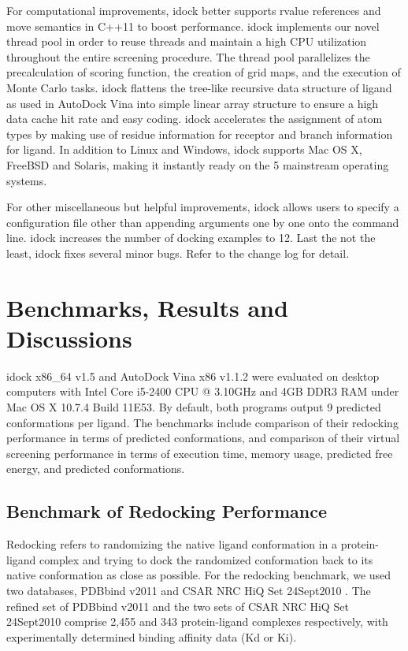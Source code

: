 \documentclass[10pt,conference,compsocconf]{../IEEEtran}
\begin{document}
For computational improvements, idock better supports rvalue references and move semantics in C++11 to boost performance. idock implements our novel thread pool in order to reuse threads and maintain a high CPU utilization throughout the entire screening procedure. The thread pool parallelizes the precalculation of scoring function, the creation of grid maps, and the execution of Monte Carlo tasks. idock flattens the tree-like recursive data structure of ligand as used in AutoDock Vina into simple linear array structure to ensure a high data cache hit rate and easy coding. idock accelerates the assignment of atom types by making use of residue information for receptor and branch information for ligand. In addition to Linux and Windows, idock supports Mac OS X, FreeBSD and Solaris, making it instantly ready on the 5 mainstream operating systems.

For other miscellaneous but helpful improvements, idock allows users to specify a configuration file other than appending arguments one by one onto the command line. idock increases the number of docking examples to 12. Last the not the least, idock fixes several minor bugs. Refer to the change log for detail.

\section{Benchmarks, Results and Discussions}

idock x86\_64 v1.5 and AutoDock Vina x86 v1.1.2 were evaluated on desktop computers with Intel Core i5-2400 CPU @ 3.10GHz and 4GB DDR3 RAM under Mac OS X 10.7.4 Build 11E53. By default, both programs output 9 predicted conformations per ligand. The benchmarks include comparison of their redocking performance in terms of predicted conformations, and comparison of their virtual screening performance in terms of execution time, memory usage, predicted free energy, and predicted conformations.

\subsection{Benchmark of Redocking Performance}

Redocking refers to randomizing the native ligand conformation in a protein-ligand complex and trying to dock the randomized conformation back to its native conformation as close as possible. For the redocking benchmark, we used two databases, PDBbind v2011 \citep{529,530} and CSAR NRC HiQ Set 24Sept2010 \citep{857,960}. The refined set of PDBbind v2011 and the two sets of CSAR NRC HiQ Set 24Sept2010 comprise 2,455 and 343 protein-ligand complexes respectively, with experimentally determined binding affinity data (Kd or Ki).
\end{document}
